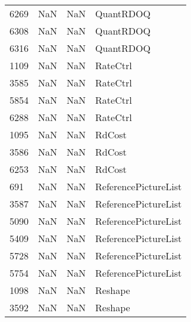 \begin{tabular}{llll}
6269 &                   NaN &                        NaN &                                 QuantRDOQ \\
6308 &                   NaN &                        NaN &                                 QuantRDOQ \\
6316 &                   NaN &                        NaN &                                 QuantRDOQ \\
1109 &                   NaN &                        NaN &                                  RateCtrl \\
3585 &                   NaN &                        NaN &                                  RateCtrl \\
5854 &                   NaN &                        NaN &                                  RateCtrl \\
6288 &                   NaN &                        NaN &                                  RateCtrl \\
1095 &                   NaN &                        NaN &                                    RdCost \\
3586 &                   NaN &                        NaN &                                    RdCost \\
6253 &                   NaN &                        NaN &                                    RdCost \\
691  &                   NaN &                        NaN &                      ReferencePictureList \\
3587 &                   NaN &                        NaN &                      ReferencePictureList \\
5090 &                   NaN &                        NaN &                      ReferencePictureList \\
5409 &                   NaN &                        NaN &                      ReferencePictureList \\
5728 &                   NaN &                        NaN &                      ReferencePictureList \\
5754 &                   NaN &                        NaN &                      ReferencePictureList \\
1098 &                   NaN &                        NaN &                                   Reshape \\
3592 &                   NaN &                        NaN &                                   Reshape \\

\end{tabular}
